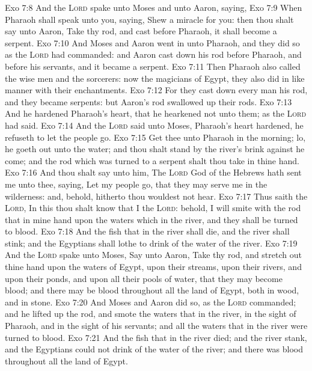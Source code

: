\vs Exo 7:8 And the \textsc{Lord} spake unto Moses and unto Aaron, saying,
\vs Exo 7:9 When Pharaoh shall speak unto you, saying, Shew a miracle for you: then thou shalt say unto Aaron, Take thy rod, and cast  before Pharaoh,  it shall become a serpent.
\vs Exo 7:10 And Moses and Aaron went in unto Pharaoh, and they did so as the \textsc{Lord} had commanded: and Aaron cast down his rod before Pharaoh, and before his servants, and it became a serpent.
\vs Exo 7:11 Then Pharaoh also called the wise men and the sorcerers: now the magicians of Egypt, they also did in like manner with their enchantments.
\vs Exo 7:12 For they cast down every man his rod, and they became serpents: but Aaron's rod swallowed up their rods.
\vs Exo 7:13 And he hardened Pharaoh's heart, that he hearkened not unto them; as the \textsc{Lord} had said.
\vs Exo 7:14 And the \textsc{Lord} said unto Moses, Pharaoh's heart  hardened, he refuseth to let the people go.
\vs Exo 7:15 Get thee unto Pharaoh in the morning; lo, he goeth out unto the water; and thou shalt stand by the river's brink against he come; and the rod which was turned to a serpent shalt thou take in thine hand.
\vs Exo 7:16 And thou shalt say unto him, The \textsc{Lord} God of the Hebrews hath sent me unto thee, saying, Let my people go, that they may serve me in the wilderness: and, behold, hitherto thou wouldest not hear.
\vs Exo 7:17 Thus saith the \textsc{Lord}, In this thou shalt know that I  the \textsc{Lord}: behold, I will smite with the rod that  in mine hand upon the waters which  in the river, and they shall be turned to blood.
\vs Exo 7:18 And the fish that  in the river shall die, and the river shall stink; and the Egyptians shall lothe to drink of the water of the river.
\vs Exo 7:19 And the \textsc{Lord} spake unto Moses, Say unto Aaron, Take thy rod, and stretch out thine hand upon the waters of Egypt, upon their streams, upon their rivers, and upon their ponds, and upon all their pools of water, that they may become blood; and  there may be blood throughout all the land of Egypt, both in  wood, and in  stone.
\vs Exo 7:20 And Moses and Aaron did so, as the \textsc{Lord} commanded; and he lifted up the rod, and smote the waters that  in the river, in the sight of Pharaoh, and in the sight of his servants; and all the waters that  in the river were turned to blood.
\vs Exo 7:21 And the fish that  in the river died; and the river stank, and the Egyptians could not drink of the water of the river; and there was blood throughout all the land of Egypt.
